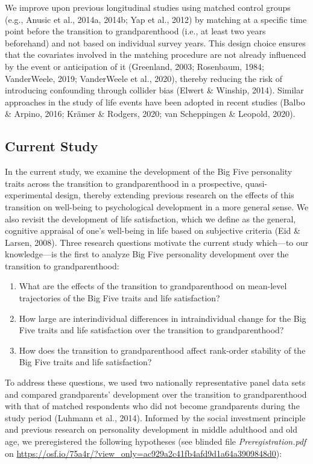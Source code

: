 \documentclass[
  english,
  man, noextraspace,floatsintext]{apa7}
\providecommand{\tightlist}{%
  \setlength{\itemsep}{0pt}\setlength{\parskip}{0pt}}
\begin{document}
We improve upon previous longitudinal studies using matched control groups (e.g., Anusic et al., 2014a, 2014b; Yap et al., 2012) by matching at a specific time point before the transition to grandparenthood (i.e., at least two years beforehand) and not based on individual survey years. This design choice ensures that the covariates involved in the matching procedure are not already influenced by the event or anticipation of it (Greenland, 2003; Rosenbaum, 1984; VanderWeele, 2019; VanderWeele et al., 2020), thereby reducing the risk of introducing confounding through collider bias (Elwert \& Winship, 2014). Similar approaches in the study of life events have been adopted in recent studies (Balbo \& Arpino, 2016; Krämer \& Rodgers, 2020; van Scheppingen \& Leopold, 2020).

\hypertarget{current-study}{%
\subsection{Current Study}\label{current-study}}

In the current study, we examine the development of the Big Five personality traits across the transition to grandparenthood in a prospective, quasi-experimental design, thereby extending previous research on the effects of this transition on well-being to psychological development in a more general sense. We also revisit the development of life satisfaction, which we define as the general, cognitive appraisal of one's well-being in life based on subjective criteria (Eid \& Larsen, 2008). Three research questions motivate the current study which---to our knowledge---is the first to analyze Big Five personality development over the transition to grandparenthood:

\begin{enumerate}
\def\labelenumi{\arabic{enumi}.}
\tightlist
\item
  What are the effects of the transition to grandparenthood on mean-level trajectories of the Big Five traits and life satisfaction?
\item
  How large are interindividual differences in intraindividual change for the Big Five traits and life satisfaction over the transition to grandparenthood?
\item
  How does the transition to grandparenthood affect rank-order stability of the Big Five traits and life satisfaction?
\end{enumerate}

To address these questions, we used two nationally representative panel data sets and compared grandparents' development over the transition to grandparenthood with that of matched respondents who did not become grandparents during the study period (Luhmann et al., 2014). Informed by the social investment principle and previous research on personality development in middle adulthood and old age, we preregistered the following hypotheses (see blinded file \emph{Preregistration.pdf} on \url{https://osf.io/75a4r/?view_only=ac929a2c41fb4afd9d1a64a3909848d0}):
\end{document}
